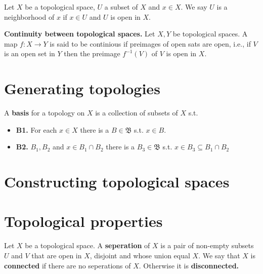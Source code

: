 \documentclass{article}
\theoremstyle{remark}
\begin{document}
\begin{definition}[Neighbourhoods]
    Let $X$ be a topological space,  $U$ a subset of $X$ and $x \in  X$. We say $ U$ is a neighborhood of $x$ if $ x \in
    U $ and $U$ is open in $X$.
\end{definition}

\begin{theorem}
    \textbf{Continuity between topological spaces.}
Let $X,Y$ be topological spaces. A map $f: X \to Y$ is said to be continious if preimages of open sats are open, i.e.,
if $V$ is an open set in $Y$ then the preimage $f^{-1} \left( V \right)$ of $V$ is open in $X$.
\end{theorem}

\section{ Generating topologies}%
\label{sec:chapter_4_generating_topologies}

\begin{definition}[Basis]
    A \textbf{basis} for a topology on $X$ is a collection of subsets of $X$ s.t.
\begin{itemize}
    \item \textbf{B1.} For each $x \in X$ there is a $B \in  \mathfrak{B} $ s.t. $x \in  B$.
    \item \textbf{B2.} $B_{1}, B_{2}$ and $x \in  B_{1} \cap B_{2} $ there is a $B_{3} \in  \mathfrak{B}  $ s.t. $x \in
        B_{3} \subseteq  B_{1} \cap B_{2} $
\end{itemize}

\end{definition}


\section{ Constructing topological spaces}%
\label{sec:chapter_5_constructing_topological_spaces}

\section{ Topological properties}%
\label{sec:chapter_6_topological_properties}

\begin{definition}
Let $X$ be a topological space. A \textbf{seperation} of $X$ is a pair of non-empty subsets $U $ and $V$ that are open
in $X$, disjoint and whose union equal $X$. We say that $X$ is \textbf{connected} if there are no seperations of $X$.
Otherwise it is \textbf{disconnected.}
\end{definition}
\end{document}

